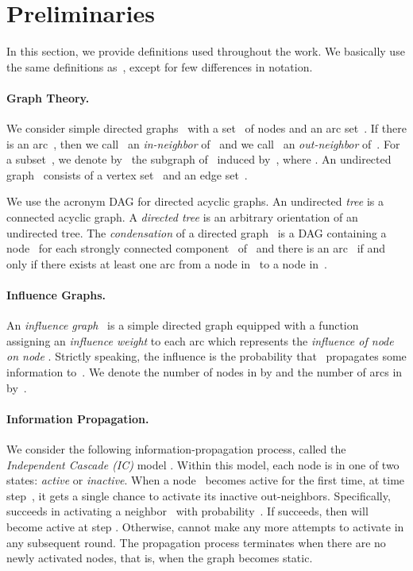 \documentclass{article}
\begin{document}
\section{Preliminaries}\label{sect:prelim}
In this section, we provide definitions used throughout the work.
We basically use the same definitions as~\citet{LTGMH10},
except for few differences in notation.

\paragraph{Graph Theory.}
We consider simple directed graphs~ with a set~ of nodes
and an arc set~.
If there is an arc~, then we call~ an \emph{in-neighbor} of~ and we call~ an \emph{out-neighbor} of~. For a subset~, we denote by~ the subgraph of~ induced by~, where .
An undirected graph~ consists of a vertex set~ and an edge set~.

We use the acronym DAG for directed acyclic graphs.
An undirected \emph{tree} is a connected acyclic graph.
A \emph{directed tree} is an arbitrary orientation of an undirected tree.
The \emph{condensation} of a directed graph~ is a DAG containing a node~ for each
strongly connected component~ of~ and there is an arc~
if and only if there exists at least one arc from a node in~ to a node in~.


\paragraph{Influence Graphs.}
An \emph{influence graph}~ is a simple directed
graph equipped with a function~
assigning an \emph{influence weight} to each arc 
which represents the \emph{influence of node  on node }. Strictly speaking,
the influence is the probability that~ propagates some information to~.
We denote the number of nodes in  by  and the
number of arcs in  by~.


\paragraph{Information Propagation.}
We consider the following information-propaga\-tion process,
called the \emph{Independent Cascade (IC)} model \cite{KKT15}.
Within this model, each node is in one of two states: \emph{active} or \emph{inactive}.
When a node~ becomes active for the first time, at time step~,
it gets a single chance to activate its inactive out-neighbors.
Specifically,  succeeds in activating a neighbor~ with probability~.
If  succeeds, then  will become active at step .
Otherwise,  cannot make any more attempts to activate  in any subsequent round.
The propagation process terminates when there are no newly activated nodes,
that is,
when the graph becomes static.
\end{document}
